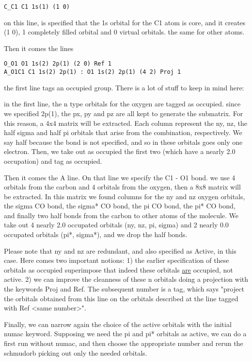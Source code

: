 \documentclass[11pt,a4paper]{article}
\begin{document}
\begin{verbatim}
C_C1 C1 1s(1) (1 0)
\end{verbatim}

on this line, is specified that the 1s orbital for the C1 atom is core, and it
creates (1 0), 1 completely filled orbital and 0 virtual orbitals. the same for
other atoms.

Then it comes the lines

\begin{verbatim}
O_O1 O1 1s(2) 2p(1) (2 0) Ref 1
A_O1C1 C1 1s(2) 2p(1) : O1 1s(2) 2p(1) (4 2) Proj 1
\end{verbatim}

the first line tags an occupied group. There is a lot of stuff to keep in mind
here:

in the first line, the n type orbitals for the oxygen are tagged as occupied.
since we specified 2p(1), the px, py and pz are all kept to generate the
submatrix. For this reason, a 4x4 matrix will be extracted. Each column
represent the ny, nz, the half sigma and half pi orbitals that arise from the
combination, respectively. We say half because the bond is not specified, and
so in these orbitals goes only one electron. Then, we take out as occupied the
first two (which have a nearly 2.0 occupation) and tag as occupied.

Then it comes the A line. On that line we specify the C1 - O1 bond. we use 4
orbitals from the carbon and 4 orbitals from the oxygen, then a 8x8 matrix will
be extracted. In this matrix we found columns for the ny and nz oxygen
orbitals, the sigma CO bond, the sigma* CO bond, the pi CO bond, the pi* CO
bond, and finally two half bonds from the carbon to other atoms of the
molecule. We take out 4 nearly 2.0 occupated orbitals (ny, nz, pi, sigma) and 2
nearly 0.0 occupated orbitals (pi*, sigma*), and we drop the half bonds.

Please note that ny and nz are redundant, and also specified as Active, in this
case. Here comes two important notions: 1) the earlier specification of these
orbitals as occupied superimpose that indeed these orbitals \underline{are} occupied, not
active. 2) we can improve the cleanness of these n orbitals doing a projection
with the keywords Proj and Ref. The subsequent number is a tag, which says
"project the orbitals obtained from this line on the orbitals described at the
line tagged with Ref <same number>".

Finally, we can narrow again the choice of the active orbitals with the initial
numac keyword. Supposing we need the pi and pi* orbitals as active, we can do a
first run without numac, and then choose the appropriate number and rerun the
schmudorb picking out only the needed orbitals.
\end{document}
